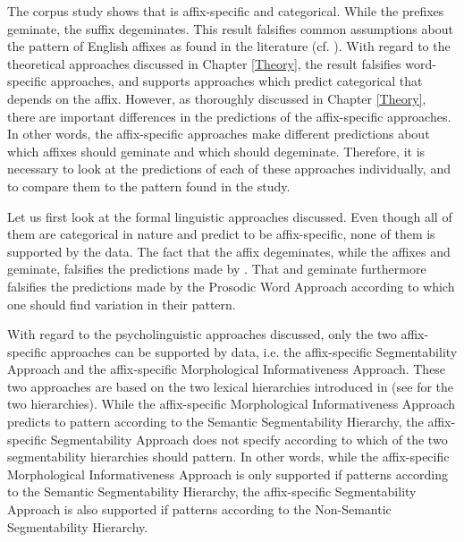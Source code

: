 The corpus study shows that  is affix-specific and categorical. While the prefixes geminate, the suffix  degeminates. 
This result falsifies common assumptions about the  pattern of English affixes as found in the literature (cf. ). 
With regard to the theoretical approaches discussed in Chapter \ref{Theory}, the result falsifies word-specific approaches, and supports approaches which predict categorical  that depends on the affix. However, as thoroughly discussed in Chapter \ref{Theory}, there are important differences in the predictions of the affix-specific approaches. In other words, the affix-specific approaches make different predictions about which affixes should geminate and which should degeminate. Therefore, it is necessary to look at the predictions of each of these approaches individually, and to compare them to the  pattern found in the study.

Let us first look at the formal linguistic approaches discussed. Even though all of them are categorical in nature and predict  to be affix-specific, none of them is supported by the data. The fact that the  affix  degeminates, while the  affixes  and  geminate, falsifies the predictions made by . That  and  geminate furthermore falsifies the predictions made by the Prosodic Word Approach according to which one should find variation in their  pattern. 

With regard to the psycholinguistic approaches discussed, only the two affix-specific approaches can be supported by data, i.e. the affix-specific Segmentability Approach and the affix-specific Morphological Informativeness Approach. 
These two approaches are based on the two lexical  hierarchies introduced in  (see  for the two hierarchies). While the affix-specific Morphological Informativeness Approach predicts  to pattern according to the Semantic Segmentability Hierarchy, the affix-specific Segmentability Approach does not specify according to which of the two segmenta\-bility hierarchies  should pattern. In other words, while the affix-specific Morphological Informativeness Approach is only supported if  patterns according to the Semantic Segmentability Hierarchy, the affix-spe\-cif\-ic Segmentability Approach is also supported if  patterns according to the Non-Semantic Segmentability Hierarchy. 


